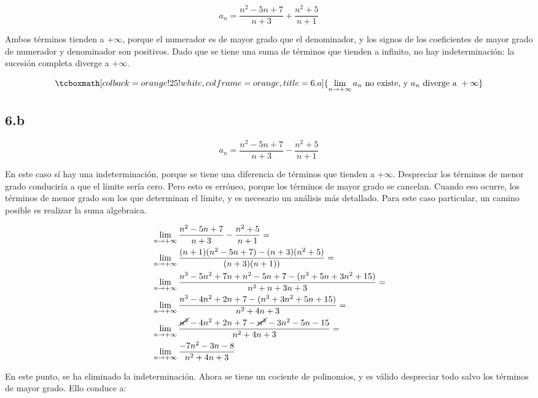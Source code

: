 \documentclass{article}
\newcommand{\hresult}[2]{\tcboxmath[colback=orange!25!white,colframe=orange, title=#1] {#2} }
\newcommand{\subsectionx}[1]{\subsection*{#1}\label{subsec:#1}\addcontentsline{toc}{subsection}{\nameref{subsec:#1}}}
\newcommand{\limninf}{\lim_{n \rightarrow +\infty}}
\begin{document}
\begin{equation}
a_n = \frac{n^2-5n+7}{n+3} + \frac{n^2 + 5}{n+1}
\end{equation}

Ambos términos tienden a $ +\infty $, porque el numerador es de mayor grado que el denominador, y los signos de los coeficientes de mayor grado de numerador y denominador son positivos. Dado que se tiene una suma de términos que tienden a infinito, no hay indeterminación: la sucesión completa diverge a $ +\infty $.

\begin{equation}
\hresult{6.a}{ \limninf a_n \text{ no existe, y } a_n \text{ diverge a } +\infty }
\end{equation}

\subsectionx{6.b}

\begin{equation}
a_n = \frac{n^2-5n+7}{n+3} - \frac{n^2 + 5}{n+1}
\end{equation}

En este caso sí hay una indeterminación, porque se tiene una diferencia de términos que tienden a $ +\infty $. Despreciar los términos de menor grado conduciría a que el límite sería cero. Pero esto es erróneo, porque los términos de mayor grado se cancelan. Cuando eso ocurre, los términos de menor grado son los que determinan el límite, y es necesario un análisis más detallado. Para este caso particular, un camino posible es realizar la suma algebraica.

\begin{subequations}
\begin{align}
& \limninf \frac{n^2-5n+7}{n+3} - \frac{n^2 + 5}{n+1} = \\
& \limninf \frac{(n+1)(n^2-5n+7)-(n+3)(n^2+5)}{(n+3) (n+1))} = \\
& \limninf \frac{n^3-5n^2+7n+n^2-5n+7-(n^3+5n+3n^2+15)}{n^2+n+3n+3} = \\
& \limninf \frac{n^3-4n^2+2n+7-(n^3+3n^2+5n+15)}{n^2+4n+3} = \\
& \limninf \frac{\cancel{n^3}-4n^2+2n+7-\cancel{n^3}-3n^2-5n-15}{n^2+4n+3} = \\
& \limninf \frac{-7n^2-3n-8}{n^2+4n+3}
\end{align}
\end{subequations}

En este punto, se ha eliminado la indeterminación. Ahora se tiene un cociente de polinomios, y es válido despreciar todo salvo los términos de mayor grado. Ello conduce a:
\end{document}
